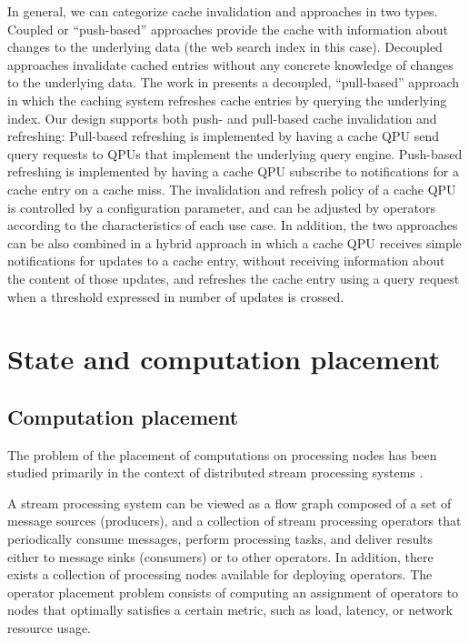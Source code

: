 In general, we can categorize cache invalidation and approaches in two types.
Coupled or ``push-based'' approaches provide the cache with information about changes to the underlying data
(the web search index in this case).
Decoupled approaches invalidate cached entries without any concrete knowledge of changes to the underlying data.
The work in \cite{cambazoglu:yahoorefreshing} presents a decoupled,
``pull-based'' approach in which the caching system refreshes cache entries by querying the underlying index.
Our design supports both push- and pull-based cache invalidation and refreshing:
Pull-based refreshing is implemented by having a cache QPU send query requests to QPUs that implement the underlying
query engine.
Push-based refreshing is implemented by having a cache QPU subscribe to notifications for a cache entry on a cache
miss.
The invalidation and refresh policy of a cache QPU is controlled by a configuration parameter,
and can be adjusted by operators according to the characteristics of each use case.
In addition, the two approaches can be also combined in a hybrid approach in which a cache QPU receives simple notifications
for updates to a cache entry, without receiving information about the content of those updates,
and refreshes the cache entry using a query request when a threshold expressed in number of updates is crossed.

\section{State and computation placement}
\label{sec:placement}
\subsection{Computation placement}

The problem of the placement of computations on processing nodes has been studied primarily in the context of distributed
stream processing systems \cite{lakshmanan:placementstrategies}.

A stream processing system can be viewed as a flow graph composed of a set of message sources (producers),
and a collection of stream processing operators that periodically consume messages, perform processing tasks,
and deliver results either to message sinks (consumers) or to other operators.
In addition, there exists a collection of processing nodes available for deploying operators.
The operator placement problem consists of computing an assignment of operators to nodes that optimally satisfies a
certain metric, such as load, latency, or network resource usage.

